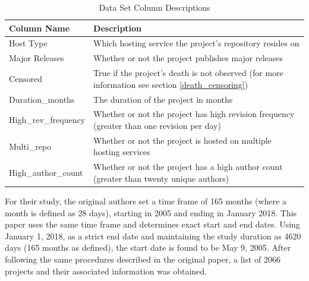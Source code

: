 \documentclass[acmconf]{acmart}
\begin{document}
\begin{table}[h!]
    \caption{Data Set Column Descriptions}
    \label{tab:data}
    \begin{tabular}{ll}
        \toprule
        Column Name & Description \\
        \midrule
        Host Type            & Which hosting service the project's repository resides on \\
        Major Releases       & Whether or not the project publishes major releases \\
        Censored             & True if the project's death is not observed (for more information see section \ref{death_censoring}) \\
        Duration\_months     & The duration of the project in months \\
        High\_rev\_frequency & Whether or not the project has high revision frequency (greater than one revision per day) \\
        Multi\_repo          & Whether or not the project is hosted on multiple hosting services\\
        High\_author\_count  & Whether or not the project has a high author count (greater than twenty unique authors) \\
        \bottomrule
    \end{tabular}
\end{table}

For their study, the original authors set a time frame of 165 months (where a month is defined as 28 days), starting in 2005 and ending in January 2018.
This paper uses the same time frame and determines exact start and end dates.
Using January 1, 2018, as a strict end date and maintaining the study duration as 4620 days (165 months as defined), the start date is found to be May 9, 2005.
After following the same procedures described in the original paper, a list of 2066 projects and their associated information was obtained.


\end{document}
